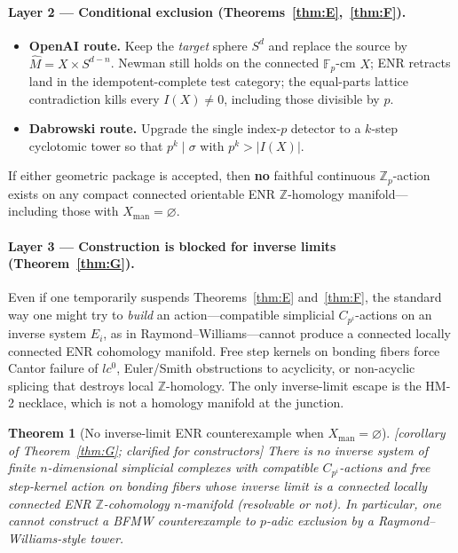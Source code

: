 \documentclass[11pt]{article}
\newtheorem{theorem}{Theorem}[section]
\theoremstyle{definition}
\newcommand{\status}[1]{\textit{\textcolor{black!70}{[#1]}}}
\begin{document}
\paragraph{Layer 2 --- Conditional exclusion (Theorems~\ref{thm:E},~\ref{thm:F}).}
\begin{itemize}
\item \textbf{OpenAI route.}  Keep the \emph{target} sphere $S^d$ and replace
the source by $\widehat{M}=X\times S^{d-n}$.  Newman still holds on the
connected $\mathbb{F}_p$-cm $X$; ENR retracts land in the idempotent-complete
test category; the equal-parts lattice contradiction kills every
$I(X)\neq 0$, including those divisible by $p$.
\item \textbf{Dabrowski route.}  Upgrade the single index-$p$ detector to a
$k$-step cyclotomic tower so that $p^k\mid\sigma$ with $p^k>|I(X)|$.
\end{itemize}
If either geometric package is accepted, then \textbf{no} faithful continuous
$\mathbb{Z}_p$-action exists on any compact connected orientable ENR
$\mathbb{Z}$-homology manifold---including those with
$X_{\mathrm{man}}=\varnothing$.

\paragraph{Layer 3 --- Construction is blocked for inverse limits
(Theorem~\ref{thm:G}).}
Even if one temporarily suspends Theorems~\ref{thm:E} and~\ref{thm:F}, the
standard way one might try to \emph{build} an action---compatible simplicial
$C_{p^i}$-actions on an inverse system $E_i$, as in Raymond--Williams---cannot
produce a connected locally connected ENR cohomology manifold.  Free step
kernels on bonding fibers force Cantor failure of $lc^0$, Euler/Smith
obstructions to acyclicity, or non-acyclic splicing that destroys local
$\mathbb{Z}$-homology.  The only inverse-limit escape is the HM-2 necklace,
which is not a homology manifold at the junction.

\begin{theorem}[No inverse-limit ENR counterexample when $X_{\mathrm{man}}=\varnothing$]
\label{thm:no-ilim-enr}
\status{corollary of Theorem~\ref{thm:G}; clarified for constructors}
There is no inverse system of finite $n$-dimensional simplicial complexes with
compatible $C_{p^i}$-actions and free step-kernel action on bonding fibers
whose inverse limit is a connected locally connected ENR
$\mathbb{Z}$-cohomology $n$-manifold (resolvable or not).  In particular, one
cannot construct a BFMW counterexample to $p$-adic exclusion by a
Raymond--Williams-style tower.
\end{theorem}
\end{document}
